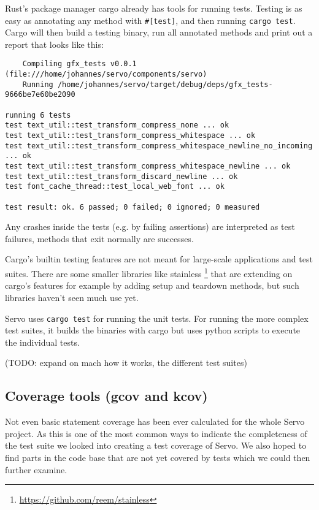 \documentclass{scrartcl}
\newcommand{\todo}[1] {{\color{red}(TODO: #1)}}
\begin{document}
Rust's package manager cargo already has tools for running tests. Testing is as easy as annotating any method with \texttt{\#[test]}, and then running \texttt{cargo test}. Cargo will then build a testing binary, run all annotated methods and print out a report that looks like this:


\begin{verbatim}
    Compiling gfx_tests v0.0.1 (file:///home/johannes/servo/components/servo)
    Running /home/johannes/servo/target/debug/deps/gfx_tests-9666be7e60be2090

running 6 tests
test text_util::test_transform_compress_none ... ok
test text_util::test_transform_compress_whitespace ... ok
test text_util::test_transform_compress_whitespace_newline_no_incoming ... ok
test text_util::test_transform_compress_whitespace_newline ... ok
test text_util::test_transform_discard_newline ... ok
test font_cache_thread::test_local_web_font ... ok

test result: ok. 6 passed; 0 failed; 0 ignored; 0 measured

\end{verbatim}

Any crashes inside the tests (e.g. by failing assertions) are interpreted as test failures, methods that exit normally are successes.

Cargo's builtin testing features are not meant for large-scale applications and test suites. There are some smaller libraries like stainless \footnote{\url{https://github.com/reem/stainless}} that are extending on cargo's features for example by adding setup and teardown methods, but such libraries haven't seen much use yet. 

Servo uses \texttt{cargo test} for running the unit tests. For running the more complex test suites, it builds the binaries with cargo but uses python scripts to execute the individual tests.

\todo{expand on mach how it works, the different test suites}


\subsection{Coverage tools (gcov and kcov)}
Not even basic statement coverage has been ever calculated for the whole Servo project. As this is one of the most common ways to indicate the completeness of the test suite we looked into creating a test coverage of Servo. We also hoped to find parts in the code base that are not yet covered by tests which we could then further examine. 
\end{document}
